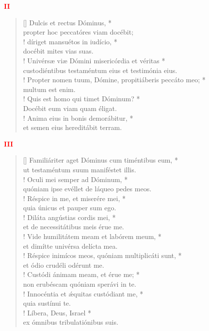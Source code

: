 \begin{center}
\textcolor{red}{\bf II}\\
\end{center}
\begin{verse}[\versewidth]
Dulcis et rectus Dóminus, *\\
propter hoc peccatóres viam docébit;\\!
\vin díriget mansuétos in iudício, *\\
\vin docébit mites vias suas.\\!
Univérsæ viæ Dómini misericórdia et véritas *\\
custodiéntibus testaméntum eius et testimónia eius.\\!
\vin Propter nomen tuum, Dómine, propitiáberis peccáto meo; *\\
\vin multum est enim.\\!
Quis est homo qui timet Dóminum? *\\
Docébit eum viam quam éligat.\\!
\vin Anima eius in bonis demorábitur, *\\
\vin et semen eius hereditábit terram.\\
\end{verse}
\begin{center}
\textcolor{red}{\bf III}\\
\end{center}
\begin{verse}[\versewidth]
Familiáriter aget Dóminus cum timéntibus eum, *\\
ut testaméntum suum maniféstet illis.\\!
\vin Oculi mei semper ad Dóminum, *\\
\vin quóniam ipse evéllet de láqueo pedes meos.\\!
Réspice in me, et miserére mei, *\\
quia únicus et pauper sum ego.\\!
\vin Diláta angústias cordis mei, *\\
\vin et de necessitátibus meis érue me.\\!
Vide humilitátem meam et labórem meum, *\\
et dimítte univérsa delícta mea.\\!
\vin Réspice inimícos meos, quóniam multiplicáti sunt, *\\
\vin et ódio crudéli odérunt me.\\!
Custódi ánimam meam, et érue me; *\\
non erubéscam quóniam sperávi in te.\\!
\vin Innocéntia et \'{æ}quitas custódiant me, *\\
\vin quia sustínui te.\\!
Líbera, Deus, Israel *\\
ex ómnibus tribulatiónibus suis.\\
\end{verse}
\vspace{1cm}


